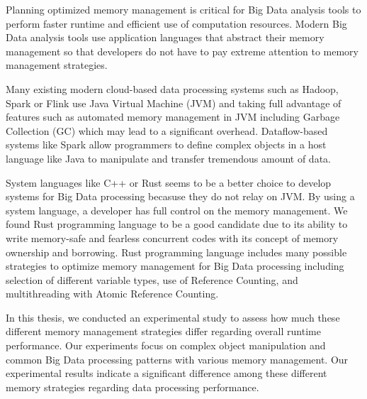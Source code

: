 

Planning optimized memory management is critical for Big Data analysis tools to
perform faster runtime and efficient use of computation resources.
Modern Big Data analysis tools use application languages that abstract their
memory management so that developers do not have to pay extreme attention
to memory management strategies.

Many existing modern cloud-based data processing systems such as Hadoop, Spark or Flink use
Java Virtual Machine (JVM) and taking full advantage of features such as automated memory management in JVM
including Garbage Collection (GC) which may lead to a significant overhead.
Dataflow-based systems like Spark allow programmers to define complex objects in a
host language like Java to manipulate and transfer tremendous amount of data.


System languages like C++ or Rust seems to be a better choice to
develop systems for Big Data processing becasuse they do not relay on JVM.
By using a system language, a developer has full control on the memory management.
We found Rust programming language to be a good candidate due to its ability to write memory-safe and
fearless concurrent codes with its concept of memory ownership and borrowing.
Rust programming language includes many possible strategies to optimize memory management for Big Data processing including
selection of different variable types, use of Reference Counting, and multithreading with Atomic Reference Counting.

In this thesis, we conducted an experimental study to assess how much these different memory management
strategies differ regarding overall runtime performance.
Our experiments focus on complex object manipulation and common Big Data processing patterns
with various memory management. Our experimental results indicate a significant
difference among these different memory strategies regarding data processing performance.
